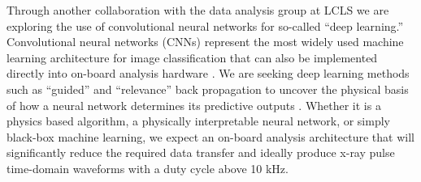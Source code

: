 Through another collaboration with the data analysis group at LCLS we are exploring the use of convolutional neural networks for so-called ``deep learning.'' %
Convolutional neural networks (CNNs) represent the most widely used machine learning architecture for image classification that can also be implemented directly into on-board analysis hardware \cite{cognimem}.
We are seeking deep learning methods such as ``guided'' and ``relevance'' back propagation to uncover the physical basis of how a neural network determines its predictive outputs \cite{Mihir}.
Whether it is a physics based algorithm, a physically interpretable neural network, or simply black-box machine learning, we expect an on-board analysis architecture that will significantly reduce the required data transfer and ideally produce x-ray pulse time-domain waveforms with a duty cycle above 10 kHz.


